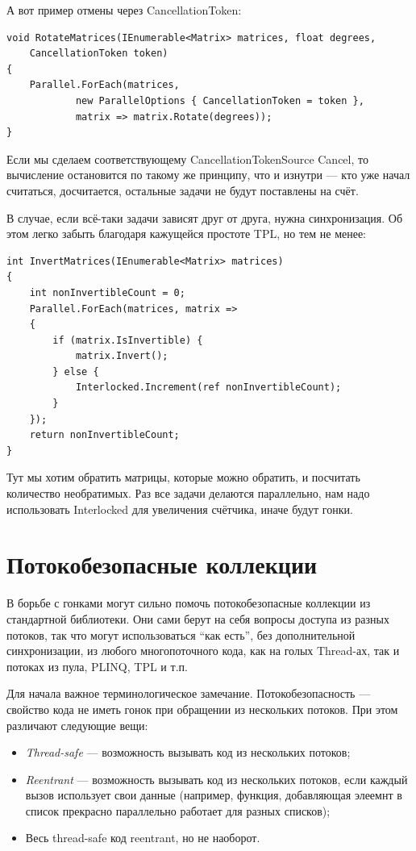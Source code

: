 \documentclass[a5paper]{article}
\begin{document}
А вот пример отмены через CancellationToken:

\begin{verbatim}
void RotateMatrices(IEnumerable<Matrix> matrices, float degrees,
    CancellationToken token)
{
    Parallel.ForEach(matrices,
            new ParallelOptions { CancellationToken = token },
            matrix => matrix.Rotate(degrees));
}
\end{verbatim}

Если мы сделаем соответствующему CancellationTokenSource Cancel, то вычисление остановится по такому же принципу, что и изнутри --- кто уже начал считаться, досчитается, остальные задачи не будут поставлены на счёт.

В случае, если всё-таки задачи зависят друг от друга, нужна синхронизация. Об этом легко забыть благодаря кажущейся простоте TPL, но тем не менее:

\begin{verbatim}
int InvertMatrices(IEnumerable<Matrix> matrices)
{
    int nonInvertibleCount = 0;
    Parallel.ForEach(matrices, matrix =>
    {
        if (matrix.IsInvertible) {
            matrix.Invert();
        } else {
            Interlocked.Increment(ref nonInvertibleCount);
        }
    });
    return nonInvertibleCount;
}
\end{verbatim}

Тут мы хотим обратить матрицы, которые можно обратить, и посчитать количество необратимых. Раз все задачи делаются параллельно, нам надо использовать Interlocked для увеличения счётчика, иначе будут гонки.

\section{Потокобезопасные коллекции}

В борьбе с гонками могут сильно помочь потокобезопасные коллекции из стандартной библиотеки. Они сами берут на себя вопросы доступа из разных потоков, так что могут использоваться ``как есть'', без дополнительной синхронизации, из любого многопоточного кода, как на голых Thread-ах, так и потоках из пула, PLINQ, TPL и т.п. 

Для начала важное терминологическое замечание. Потокобезопасность --- свойство кода не иметь гонок при обращении из нескольких потоков. При этом различают следующие вещи:
\begin{itemize}
    \item \textit{Thread-safe} --- возможность вызывать код из нескольких потоков;
    \item \textit{Reentrant} --- возможность вызывать код из нескольких потоков, если каждый вызов использует свои данные (например, функция, добавляющая элеемнт в список прекрасно параллельно работает для разных списков);
    \item Весь thread-safe код reentrant, но не наоборот.
\end{itemize}
\end{document}
